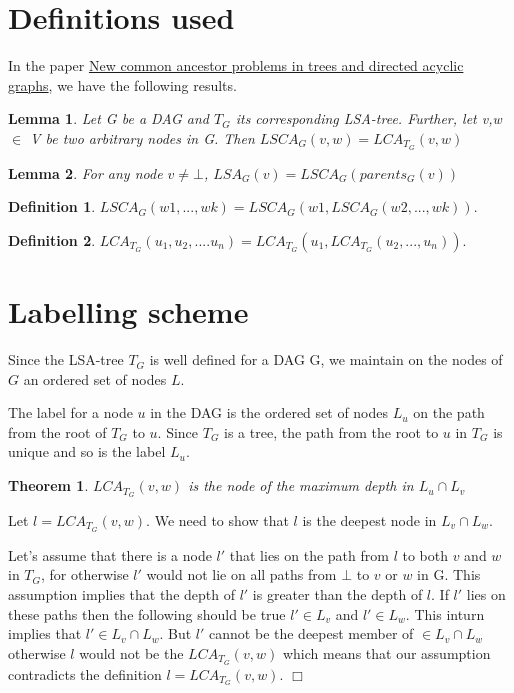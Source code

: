 \documentclass{paper}
\newtheorem{theorem}{Theorem}
\newtheorem{definition}{Definition}
\newtheorem{lemma}{Lemma}
\newenvironment{proof}{{\noindent\bf Proof. } }{{\hfill $\Box$}}
\begin{document}
\section{Definitions used}
In the paper \href{https://doi.org/10.1016/j.ipl.2010.02.014}{New common ancestor problems in trees and directed acyclic graphs}, we have the following results.

\begin{lemma}\label{lemma1}
	 Let G be a DAG and $T_G$  its corresponding LSA-tree. Further, let v,w $\in$ V be two arbitrary nodes in G. Then $LSCA_G(v,w) = LCA_{T_G}(v,w)$
\end{lemma}

\begin{lemma}\label{lemma2}
	For any node $v \neq \bot $, $LSA_G(v) = LSCA_G(parents_G(v))$
\end{lemma}

\begin{definition}\label{definition1}
	$LSCA_G (w1,...,wk) = LSCA_G (w1, LSCA_G (w2, ... ,wk)).$
\end{definition}

\begin{definition}\label{definition2}
	$LCA_{T_G} (u_1, u_2, .... u_n) = LCA_{T_G} (u_1, LCA_{T_G} (u_2, ... ,u_n)).$
\end{definition}

\section{Labelling scheme}
Since the LSA-tree $T_G$ is well defined for a DAG G, we maintain on the nodes of $G$ an ordered set of nodes $L$.

The label for a node $u$ in the DAG is the ordered set of nodes $L_u$ on the path from the root of $T_G$ to $u$. Since $T_G$ is a tree, the path from the root to $u$ in $T_G$ is unique and so is the label $L_u$.

\begin{theorem} \label{thm1}
	$LCA_{T_G}(v,w)$ is the node of the maximum depth in $L_u \cap L_v$
\end{theorem}
\begin{proof}
	Let $l = LCA_{T_G}(v,w)$. We need to show that $l$ is the deepest node in  $L_v \cap L_w$.

	Let's assume that there is a node $l'$ that lies on the path from $l$ to both $v$ and $w$ in $T_G$, for otherwise $l'$ would not lie on all paths from $\bot$ to $v$ or $ w$ in G. This assumption implies that the depth of $l'$ is greater than the depth of $l$. If  $l'$ lies on these paths then the following should be true $l' \in L_v$ and $l' \in L_w$. This inturn implies that $l' \in L_v \cap L_w$. But $l'$ cannot be the deepest member of $\in L_v \cap L_w$ otherwise $l$ would not be the $LCA_{T_G}(v,w)$ which means that our assumption contradicts the definition $l = LCA_{T_G}(v,w)$.
\end{proof}\\
\end{document}
